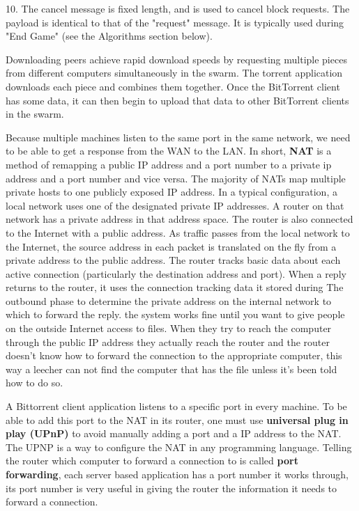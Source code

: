 \documentclass[11pt]{article}
\begin{document}
  \begin{flushleft}

    10. The cancel message is fixed length, and is used to cancel block requests. The payload is identical to that of the "request" message. It is typically used during "End Game" (see the Algorithms section below).

  \end{flushleft}
  \begin{flushleft}

    Downloading peers achieve rapid download speeds by requesting multiple pieces from different computers simultaneously in the swarm.
    The torrent application downloads each piece and combines them together. Once the BitTorrent client has some data, it can then begin to upload that data to other BitTorrent clients in the swarm.

  \end{flushleft}
  \begin{flushleft}
  \end{flushleft}
  \begin{flushleft}

    Because multiple machines listen to the same port in the same network, we need to be able to get a response from the WAN to the LAN. In short, \textbf{NAT} is a method of remapping a public IP address and a port number to a private ip address and a port number and vice versa. The majority of NATs map multiple private hosts to one publicly exposed IP address. In a typical configuration, a local network uses one of the designated private IP addresses. A router on that network has a private address in that address space. The router is also connected to the Internet with a public address. As traffic passes from the local network to the Internet, the source address in each packet is translated on the fly from a private address to the public address. The router tracks basic data about each active connection (particularly the destination address and port). When a reply returns to the router, it uses the connection tracking data it stored during The outbound phase to determine the private address on the internal network to which to forward the reply. the system works fine until you want to give people on the outside Internet access to files. When they try to reach the computer through the public IP address they actually reach the router and the router doesn't know how to forward the connection to the appropriate computer, this way a leecher can not find the computer that has the file unless it's been told how to do so.

    A Bittorrent client application listens to a specific port in every machine. To be able to add this port to the NAT in its router, one must use \textbf{universal plug in play (UPnP)} to avoid manually adding a port and a IP address to the NAT. The UPNP is a way to configure the NAT in any programming language. Telling the router which computer to forward a connection to is called \textbf{port forwarding}, each server based application has a port number it works through, its port number is very useful in giving the router the information it needs to forward a connection.

  \end{flushleft}
\end{document}
